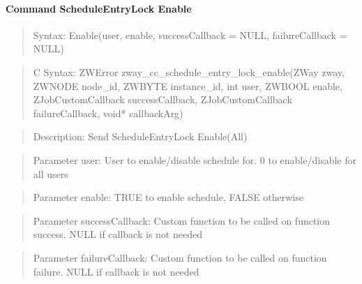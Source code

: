 \paragraph{Command ScheduleEntryLock Enable}
\begin{quote}Syntax: Enable(user, enable, successCallback = NULL, failureCallback = NULL)\end{quote}
\begin{quote}C Syntax: ZWError zway\_cc\_schedule\_entry\_lock\_enable(ZWay zway, ZWNODE node\_id, ZWBYTE instance\_id, int user, ZWBOOL enable, ZJobCustomCallback successCallback, ZJobCustomCallback failureCallback, void* callbackArg)\end{quote}
\begin{quote}Description: Send ScheduleEntryLock Enable(All)\end{quote}
\begin{quote}Parameter user: User to enable/disable schedule for. 0 to enable/disable for all users\end{quote}
\begin{quote}Parameter enable: TRUE to enable schedule, FALSE otherwise\end{quote}
\begin{quote}Parameter successCallback: Custom function to be called on function success. NULL if callback is not needed\end{quote}
\begin{quote}Parameter failureCallback: Custom function to be called on function failure. NULL if callback is not needed\end{quote}


